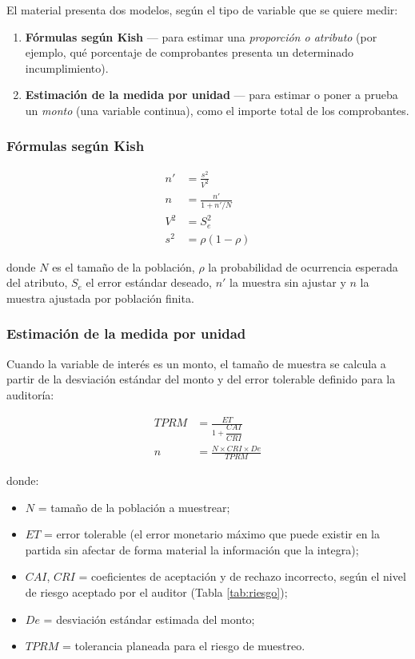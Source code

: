 \documentclass[12pt, a4paper]{article}
\theoremstyle{plain}
\theoremstyle{definition}
\theoremstyle{remark}
\begin{document}
El material presenta dos modelos, según el tipo de variable que se quiere
medir:

\begin{enumerate}
    \item \textbf{Fórmulas según Kish} --- para estimar una
    \emph{proporción o atributo} (por ejemplo, qué porcentaje de comprobantes
    presenta un determinado incumplimiento).

    \item \textbf{Estimación de la medida por unidad} --- para estimar o
    poner a prueba un \emph{monto} (una variable continua), como el importe
    total de los comprobantes.
\end{enumerate}

\subsubsection{Fórmulas según Kish}

\begin{align}
    n' &= \frac{s^2}{V^2} \\
    n &= \frac{n'}{1 + n'/N} \\
    V^2 &= S_e^2 \\
    s^2 &= \rho (1-\rho)
\end{align}

donde $N$ es el tamaño de la población, $\rho$ la probabilidad de ocurrencia
esperada del atributo, $S_e$ el error estándar deseado, $n'$ la muestra sin
ajustar y $n$ la muestra ajustada por población finita.

\subsubsection{Estimación de la medida por unidad}

Cuando la variable de interés es un monto, el tamaño de muestra se calcula
a partir de la desviación estándar del monto y del error tolerable definido
para la auditoría:

\begin{align}
    TPRM &= \frac{ET}{1 + \dfrac{CAI}{CRI}} \\[4pt]
    n &= \frac{N \times CRI \times De}{TPRM}
\end{align}

donde:
\begin{itemize}[nosep]
    \item $N$ = tamaño de la población a muestrear;
    \item $ET$ = error tolerable (el error monetario máximo que puede existir
          en la partida sin afectar de forma material la información que
          la integra);
    \item $CAI$, $CRI$ = coeficientes de aceptación y de rechazo incorrecto,
          según el nivel de riesgo aceptado por el auditor (Tabla
          \ref{tab:riesgo});
    \item $De$ = desviación estándar estimada del monto;
    \item $TPRM$ = tolerancia planeada para el riesgo de muestreo.
\end{itemize}
\end{document}
